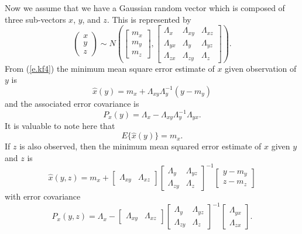 	Now we assume that we have a Gaussian random
vector which is composed of three sub-vectors $x$, $y$, and $z$.
This is represented by
%
\begin{equation}
\left(\begin{array}{c}x\\y\\z\end{array}\right)
\sim
  N\left(\left[\begin{array}{c}m_x\\m_y\\m_z\end{array}\right],
  \left[\begin{array}{ccc}\Lambda_{x}&\Lambda_{xy}&\Lambda_{xz}\\
                          \Lambda_{yx}&\Lambda_{y}&\Lambda_{yz}\\
                          \Lambda_{zx}&\Lambda_{zy}&\Lambda_{z}
\end{array}
   \right]\right).
\label{e.kf8}
\end{equation}
%
From (\ref{e.kf4}) the minimum mean square error estimate of 
$x$ given observation of $y$ is 
%
\begin{equation}
\hat{x}(y)=m_x+\Lambda_{xy}\Lambda_y^{-1}(y-m_y)
\label{e.kf9}
\end{equation}
%
and the associated error covariance is
%
\begin{equation}
P_x(y)=\Lambda_x-\Lambda_{xy}\Lambda_y^{-1}\Lambda_{yx}.
\label{e.kf10}
\end{equation}
%
It is valuable to note here that
%
\begin{equation}
E\{\hat{x}(y)\}=m_x.
\label{e.kf11}
\end{equation}
%
If $z$ is also observed, then the minimum mean squared error estimate 
of $x$ given $y$ and $z$ is
%
\begin{equation}
\hat{x}(y,z)=m_x+[\begin{array}{cc}
\Lambda_{xy}&\Lambda_{xz}\end{array}]
\left[\begin{array}{cc}\Lambda_y & \Lambda_{yz}\\
                       \Lambda_{zy} & \Lambda_{z}\end{array}\right]^{-1}
\left[\begin{array}{c}
y-m_y\\z-m_z\end{array}\right]
\label{e.kf12}
\end{equation}
%
with error covariance
%
\begin{equation}
P_x(y,z)=\Lambda_x-[\begin{array}{cc}
\Lambda_{xy}&\Lambda_{xz}\end{array}]
\left[\begin{array}{cc}\Lambda_y & \Lambda_{yz}\\
                       \Lambda_{zy} & \Lambda_{z}\end{array}\right]^{-1}
\left[\begin{array}{c}
\Lambda_{yx}\\\Lambda_{zx}\end{array}\right].
\label{e.kf13}
\end{equation}
